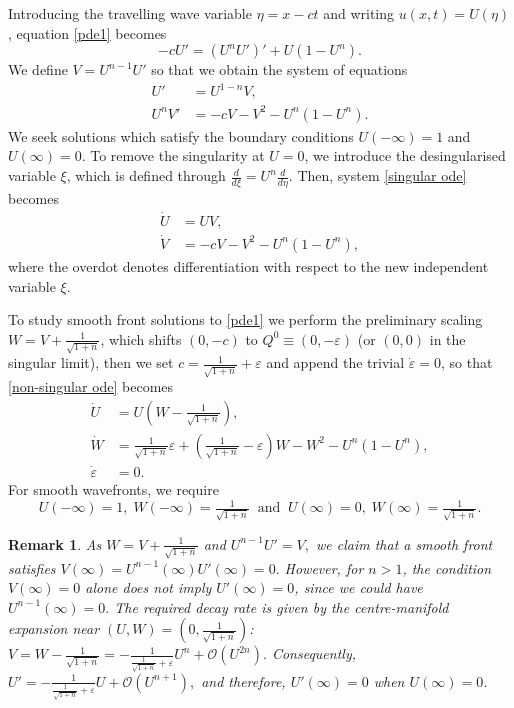 \documentclass[10pt,a4paper]{amsart}
\newtheorem{remark}{Remark}
\begin{document}
Introducing the travelling wave variable $\eta=x-ct$ and writing $u(x,t)=U(\eta)$, equation \eqref{pde1} becomes
\begin{equation}
    -cU'=(U^nU')'+U(1-U^n).
    \label{tw ode}
\end{equation}
We define $V=U^{n-1}U'$ so that we obtain the system of equations
\begin{equation}
    \begin{aligned}
        U'&=U^{1-n}V,\\
        U^n V'&=-cV-V^2-U^n(1-U^n).
        \label{singular ode}
    \end{aligned}
\end{equation}
We seek solutions which satisfy the boundary conditions $U(-\infty)=1$ and $U(\infty)=0.$ To remove the singularity at $U=0$, we introduce the desingularised variable $\xi$, which is defined through $\tfrac{d}{d\xi}=U^n\tfrac{d}{d\eta}$. Then, system \eqref{singular ode} becomes
\begin{equation}
    \begin{aligned}
        \dot{U} &=UV,\\
        \dot{V} &=-cV-V^2-U^n(1-U^n),
        \label{non-singular ode}
    \end{aligned}
\end{equation}
where the overdot denotes differentiation with respect to the new independent variable $\xi$.

To study smooth front solutions to \eqref{pde1} we perform the preliminary scaling $W=V+\tfrac{1}{\sqrt{1+n}}$, which shifts $\left(0, -c\right)$ to $Q^0\equiv(0, -\varepsilon)$ (or $(0,0)$ in the singular limit), then we set $c=\tfrac{1}{\sqrt{1+n}}+\varepsilon$ and append the trivial $\dot{\varepsilon}=0$, so that \eqref{non-singular ode} becomes
\begin{equation}
    \begin{aligned}
        \dot{U} &=U\left(W-\tfrac{1}{\sqrt{1+n}}\right),\\
        \dot{W} &=\tfrac{1}{\sqrt{1+n}}\varepsilon+\left(\tfrac{1}{\sqrt{1+n}}-\varepsilon\right)W-W^2-U^n(1-U^n),\\
        \dot{\varepsilon}&=0.
        \label{ode epsilon}
    \end{aligned}
\end{equation}
For smooth wavefronts, we require
$$U(-\infty)=1,\;W(-\infty)=\tfrac{1}{\sqrt{1+n}} \;\;\text{and}\;\; U(\infty)=0,\;W(\infty)=\tfrac{1}{\sqrt{1+n}}.$$
\begin{remark}
As $W=V+\tfrac{1}{\sqrt{1+n}}$ and $U^{n-1} U'=V,$
we claim that a smooth front satisfies
$V(\infty)=U^{n-1}(\infty)U'(\infty)=0.$ However, for $n>1$, the condition $V(\infty)=0$ alone does not imply $U'(\infty)=0$, since we could have $U^{n-1}(\infty)=0.$ The required decay rate is given by the
centre-manifold expansion near $(U,W)=\left(0, \tfrac{1}{\sqrt{1+n}}\right)$: $V=W-\tfrac{1}{\sqrt{1+n}}=-\tfrac{1}{\tfrac{1}{\sqrt{1+n}}+\varepsilon}U^n+\mathcal{O}(U^{2n}).$
Consequently,
$U'=-\tfrac{1}{\tfrac{1}{\sqrt{1+n}}+\varepsilon}U+\mathcal{O}(U^{n+1}),$
and therefore,  $U'(\infty)=0$ when $U(\infty)=0$.
\end{remark}
\end{document}
